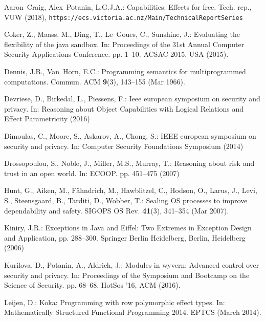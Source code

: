 \documentclass[runningheads]{llncs}
\begin{document}
\begin{thebibliography}{10}
\scriptsize
\vspace{-0.2cm}
\providecommand{\url}[1]{\texttt{#1}}
\providecommand{\urlprefix}{URL }
\providecommand{\doi}[1]{https://doi.org/#1}

Aaron~Craig, Alex~Potanin, L.G.J.A.: Capabilities: Effects for free. Tech.
  rep., VUW (2018), \url{https://ecs.victoria.ac.nz/Main/TechnicalReportSeries}

Coker, Z., Maass, M., Ding, T., Le~Goues, C., Sunshine, J.: Evaluating the
  flexibility of the java sandbox. In: Proceedings of the 31st Annual Computer
  Security Applications Conference. pp. 1--10. ACSAC 2015, USA (2015).

Dennis, J.B., Van~Horn, E.C.: Programming semantics for multiprogrammed
  computations. Commun. ACM  \textbf{9}(3),  143--155 (Mar 1966).

Devriese, D., Birkedal, L., Piessens, F.: Ieee european symposium on security
  and privacy. In: Reasoning about Object Capabilities with Logical Relations
  and Effect Parametricity (2016)

Dimoulas, C., Moore, S., Askarov, A., Chong, S.: IEEE european symposium on
  security and privacy. In: Computer Security Foundations Symposium (2014)

Drossopoulou, S., Noble, J., Miller, M.S., Murray, T.: Reasoning about risk and
  trust in an open world. In: ECOOP. pp. 451--475 (2007)

Hunt, G., Aiken, M., F\"{a}hndrich, M., Hawblitzel, C., Hodson, O., Larus, J.,
  Levi, S., Steensgaard, B., Tarditi, D., Wobber, T.: Sealing OS processes to
  improve dependability and safety. SIGOPS OS Rev. \textbf{41}(3),
  341--354 (Mar 2007).

Kiniry, J.R.: Exceptions in Java and Eiffel: Two Extremes in Exception Design
  and Application, pp. 288--300. Springer Berlin Heidelberg, Berlin, Heidelberg
  (2006)

Kurilova, D., Potanin, A., Aldrich, J.: Modules in wyvern: Advanced control
  over security and privacy. In: Proceedings of the Symposium and Bootcamp on
  the Science of Security. pp. 68--68. HotSos '16, ACM (2016).

Leijen, D.: Koka: Programming with row polymorphic effect types. In:
  Mathematically Structured Functional Programming 2014. EPTCS (March 2014).


\end{thebibliography}
\end{document}
